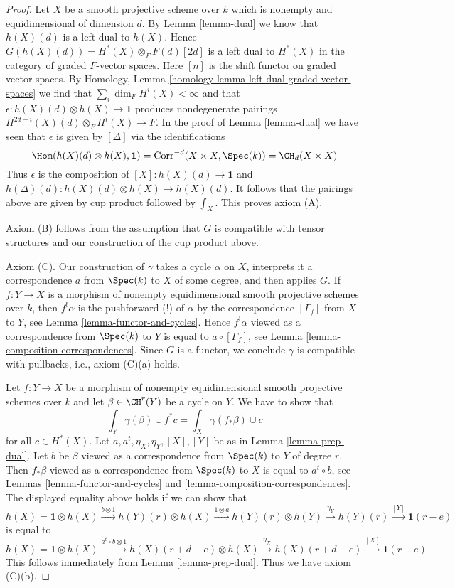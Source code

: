\begin{proof}
\medskip\noindent
Let $X$ be a smooth projective scheme over $k$ which is
nonempty and equidimensional of dimension $d$. By Lemma \ref{lemma-dual}
we know that $h(X)(d)$ is a left dual to $h(X)$. Hence
$G(h(X)(d)) = H^*(X) \otimes_F F(d)[2d]$
is a left dual to $H^*(X)$ in the category of graded $F$-vector spaces.
Here $[n]$ is the shift functor on graded vector spaces.
By Homology, Lemma \ref{homology-lemma-left-dual-graded-vector-spaces}
we find that $\sum_i \dim_F H^i(X) < \infty$ and that
$\epsilon : h(X)(d) \otimes h(X) \to \mathbf{1}$ produces
nondegenerate pairings $H^{2d - i}(X)(d) \otimes_F H^i(X) \to F$.
In the proof of Lemma \ref{lemma-dual} we have seen that
$\epsilon$ is given by $[\Delta]$ via the identifications
$$
\Hom(h(X)(d) \otimes h(X), \mathbf{1}) =
\text{Corr}^{-d}(X \times X, \Spec(k)) =
\CH_d(X \times X)
$$
Thus $\epsilon$ is the composition of $[X] : h(X)(d) \to \mathbf{1}$
and $h(\Delta)(d) : h(X)(d) \otimes h(X) \to h(X)(d)$. It follows
that the pairings above are given by cup product followed by
$\int_X$. This proves axiom (A).

\medskip\noindent
Axiom (B) follows from the assumption that $G$ is compatible
with tensor structures and our construction of the cup product above.

\medskip\noindent
Axiom (C). Our construction of $\gamma$ takes a cycle $\alpha$ on $X$,
interprets it a correspondence $a$ from $\Spec(k)$ to $X$ of some degree,
and then applies $G$. If $f : Y \to X$ is a morphism of nonempty
equidimensional smooth projective schemes over $k$, then
$f^!\alpha$ is the pushforward (!) of $\alpha$
by the correspondence $[\Gamma_f]$ from $X$ to $Y$, see
Lemma \ref{lemma-functor-and-cycles}. Hence
$f^!\alpha$ viewed as a correspondence from $\Spec(k)$ to $Y$
is equal to $a \circ [\Gamma_f]$, see
Lemma \ref{lemma-composition-correspondences}.
Since $G$ is a functor, we conclude
$\gamma$ is compatible with pullbacks, i.e., axiom (C)(a) holds.

\medskip\noindent
Let $f : Y \to X$ be a morphism of nonempty equidimensional
smooth projective schemes over $k$ and
let $\beta \in \CH^r(Y)$ be a cycle on $Y$. We have to show that
$$
\int_Y \gamma(\beta) \cup f^*c = \int_X \gamma(f_*\beta) \cup c
$$
for all $c \in H^*(X)$. Let $a, a^t, \eta_X, \eta_Y, [X], [Y]$
be as in Lemma \ref{lemma-prep-dual}.
Let $b$ be $\beta$ viewed as a correspondence from $\Spec(k)$ to $Y$
of degree $r$. Then $f_*\beta$ viewed as a correspondence from
$\Spec(k)$ to $X$ is equal to $a^t \circ b$, see
Lemmas \ref{lemma-functor-and-cycles} and
\ref{lemma-composition-correspondences}.
The displayed equality above holds if we can show that
$$
h(X) = \mathbf{1} \otimes h(X)
\xrightarrow{b \otimes 1}
h(Y)(r) \otimes h(X)
\xrightarrow{1 \otimes a}
h(Y)(r) \otimes h(Y)
\xrightarrow{\eta_Y}
h(Y)(r)
\xrightarrow{[Y]}
\mathbf{1}(r - e)
$$
is equal to
$$
h(X) = \mathbf{1} \otimes h(X)
\xrightarrow{a^t \circ b \otimes 1}
h(X)(r + d - e) \otimes h(X)
\xrightarrow{\eta_X}
h(X)(r + d - e)
\xrightarrow{[X]}
\mathbf{1}(r - e)
$$
This follows immediately from Lemma \ref{lemma-prep-dual}.
Thus we have axiom (C)(b).


\end{proof}

